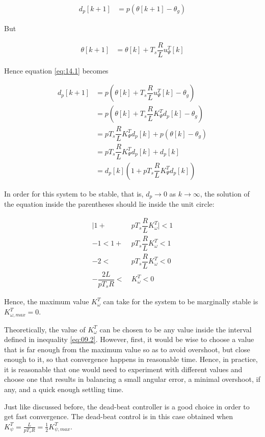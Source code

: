 \begin{align}
  d_p[k+1] &= p (\theta[k+1] - \theta_g) \label{eq:14.1}
\end{align}

But

\begin{align*}
  \theta[k+1] &= \theta[k] + T_s \dfrac{R}{L} u_{\Psi}^T[k]
\end{align*}

Hence equation \ref{eq:14.1} becomes

\begin{align*}
  d_p[k+1] &= p (\theta[k] + T_s \dfrac{R}{L} u_{\Psi}^T[k] - \theta_g) \\
           &= p(\theta[k] + T_s \dfrac{R}{L} K_{\Psi}^T d_p[k] - \theta_g)  \\
           &= p T_s \dfrac{R}{L} K_{\Psi}^T d_p[k] + p (\theta[k] - \theta_g) \\
           &= p T_s \dfrac{R}{L} K_{\Psi}^T d_p[k] + d_p[k] \\
           &= d_p[k] (1 + p T_s \dfrac{R}{L} K_{\Psi}^T d_p[k])
\end{align*}

In order for this system to be stable, that is, $d_p \to 0$ as $k \to \infty$,
the solution of the equation inside the parentheses should lie inside the unit
circle:

\begin{align}
  \Big|1 + &p T_s \dfrac{R}{L} K_{\omega}^T\Big| < 1 \nonumber \\
  -1 < 1 + &p T_s \dfrac{R}{L} K_{\omega}^T < 1 \nonumber \\
  -2 < &p T_s \dfrac{R}{L} K_{\omega}^T < 0 \nonumber \\
  -\dfrac{2L}{p T_s R} <\ &K_{\omega}^T < 0 \label{eq:14.2}
\end{align}

Hence, the maximum value $K_{\omega}^T$ can take for the system to be marginally
stable is $K_{\omega,max}^T = 0$.

Theoretically, the value of $K_{\omega}^T$ can be chosen to be any value inside
the interval defined in inequality \ref{eq:09.2}. However, first, it would be
wise to choose a value that is far enough from the maximum value so as to avoid
overshoot, but close enough to it, so that convergence happens in reasonable
time. Hence, in practice, it is reasonable that one would need to experiment
with different values and choose one that results in balancing a small angular
error, a minimal overshoot, if any, and a quick enough settling time.

Just like discussed before, the dead-beat controller is a good choice in order to
get fast convergence. The dead-beat control is in this case obtained when
$K_\psi ^T = \frac{L}{pT_s R} = \frac{1}{2}K_{\psi,max} ^T$.

